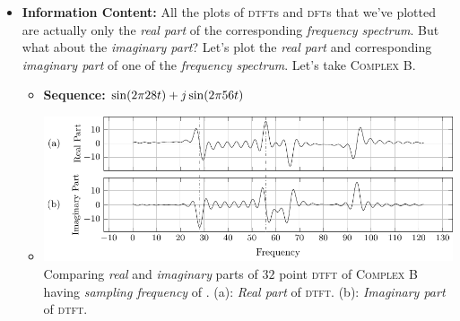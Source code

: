 \documentclass[../../course]{subfiles}
\begin{document}
\begin{itemize} [label=]
\begin{itemize} [label=]
\begin{minipage}[b] {0.85\textwidth}
                     {
                        Usable \emph{information} from \firstRange range in $32$ point \textsc{dtft} of
                        \textsc{Complex B} having \emph{sampling frequency} of \sampFreqSligGreatJust.
                    }
                    \label{plt:halfSampFreq}

                \end{minipage}

        \end{itemize}

    \item \textbf{Information Content:} All the plots of \textsc{dtft}s and \textsc{dft}s
        that we've plotted are actually only the \emph{real part} of the corresponding
        \emph{frequency spectrum}. But what about the \emph{imaginary part}? Let's plot
        the \emph{real part} and corresponding \emph{imaginary part} of one of the
        \emph{frequency spectrum}. Let's take \textsc{Complex B.}

        \begin{itemize} [label=]

            \item \textbf{Sequence:} $\sin(2 \pi 28 t) + j \sin(2 \pi 56 t)$

            \item
                \begin{minipage}[b] {0.85\textwidth}
                    \vspace{6pt}
                    \centering
                     {
                        \includegraphics[height = 0.8\textheight] {tikzpics/plotCompRealImagComp.pdf}
                    }
                     {
                        Comparing \emph{real} and \emph{imaginary} parts of $32$ point \textsc{dtft}
                        of \textsc{Complex B} having \emph{sampling frequency} of \sampFreqSligGreatJust.
                        (a): \emph{Real part} of \textsc{dtft}.
                        (b): \emph{Imaginary part} of \textsc{dtft}.
                    }
                    \label{fig:compRealImagComp}
                \end{minipage}


\end{itemize}
\end{itemize}
\end{document}
